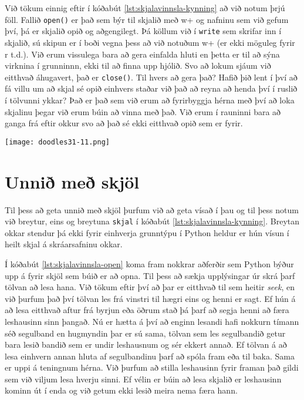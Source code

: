 Við tökum einnig eftir í kóðabút \ref{lst:skjalavinnsla-kynning} að við notum þrjú föll.
Fallið \texttt{open()} er það sem býr til skjalið með w+ og nafninu sem við gefum því, þá er skjalið opið og aðgengilegt.
Þá köllum við í \texttt{write} sem skrifar inn í skjalið, sú skipun er í boði vegna þess að við notuðum w+ (er ekki möguleg fyrir r t.d.).
Við erum vissulega bara að gera einfalda hluti en þetta er til að sýna virknina í grunninnn, ekki til að finna upp hjólið.
Svo að lokum sjáum við eitthvað áhugavert, það er \texttt{close()}.
Til hvers að gera það?
Hafið þið lent í því að fá villu um að skjal sé opið einhvers staðar við það að reyna að henda því í ruslið í tölvunni ykkar?
Það er það sem við erum að fyrirbyggja hérna með því að loka skjalinu þegar við erum búin að vinna með það.
Við erum í rauninni bara að ganga frá eftir okkur svo að það sé ekki eitthvað opið sem er fyrir.
\phantom{easter egg}
\begin{center}
	\texttt{[image: doodles31-11.png]}
\end{center}
\section{Unnið með skjöl}\label{uk:skjalavinnsla-kynnt}
Til þess að geta unnið með skjöl þurfum við að geta vísað í þau og til þess notum við breytur, eins og breytuna \texttt{skjal} í kóðabút \ref{lst:skjalavinnsla-kynning}.
Breytan okkar stendur þá ekki fyrir einhverja grunntýpu í Python heldur er hún vísun í heilt skjal á skráarsafninu okkar.

Í kóðabút \ref{lst:skjalavinnsla-open} koma fram nokkrar aðferðir sem Python býður upp á fyrir skjöl sem búið er að opna.
Til þess að sækja upplýsingar úr skrá þarf tölvan að lesa hana.
Við tökum eftir því að þar er eitthvað til sem heitir \textit{seek}, en við þurfum það því tölvan les frá vinstri til hægri eins og henni er sagt.
Ef hún á að lesa eitthvað aftur frá byrjun eða öðrum stað þá þarf að segja henni að færa leshausinn sinn þangað.
Nú er hætta á því að enginn lesandi hafi nokkurn tímann séð segulband en hugmyndin þar er sú sama, tölvan sem les segulbandið getur bara lesið bandið sem er undir leshausnum og sér ekkert annað.
Ef tölvan á að lesa einhvern annan hluta af segulbandinu þarf að spóla fram eða til baka.
Sama er uppi á teningnum hérna.
Við þurfum að stilla leshausinn fyrir framan það gildi sem við viljum lesa hverju sinni.
Ef vélin er búin að lesa skjalið er leshausinn kominn út í enda og við getum ekki lesið meira nema færa hann.

